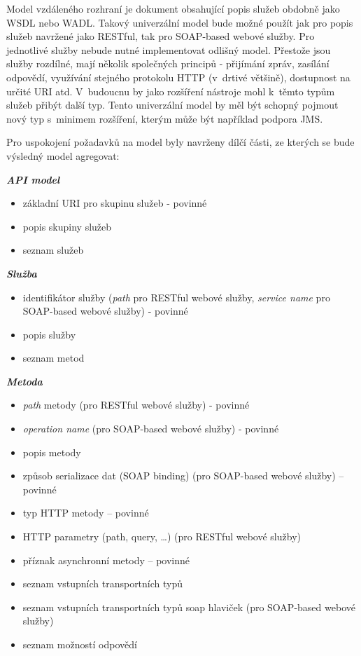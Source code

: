 \documentclass[11pt,twoside,a4paper]{book}
\begin{document}
Model vzdáleného rozhraní je dokument obsahující popis služeb obdobně jako WSDL
nebo WADL. Takový univerzální model bude možné použít jak pro popis služeb
navržené jako RESTful, tak pro SOAP-based webové služby. Pro jednotlivé služby
nebude nutné implementovat odlišný model. Přestože jsou služby rozdílné, mají
několik společných principů - přijímání zpráv, zasílání odpovědí, využívání
stejného protokolu HTTP (v~drtivé většině), dostupnost na určité URI atd.
V~budoucnu by jako rozšíření nástroje mohl k~těmto typům služeb přibýt další typ.
Tento univerzální model by měl být schopný pojmout nový typ s~minimem rozšíření,
kterým může být například podpora JMS.

Pro uspokojení požadavků na model byly navrženy dílčí části, ze kterých se bude
výsledný model agregovat:

\textbf{\textit{API model}}

\begin{itemize}
  \item základní URI pro skupinu služeb - povinné
  \item popis skupiny služeb
  \item seznam služeb
\end{itemize}

\textbf{\textit{Služba}}

\begin{itemize}
  \item identifikátor služby ({\em path} pro RESTful webové služby, {\em service
  name} pro SOAP-based webové služby) - povinné
  \item popis služby
  \item seznam metod
\end{itemize}

\textbf{\textit{Metoda}}

\begin{itemize}
  \item {\em path} metody (pro RESTful webové služby) - povinné
  \item {\em operation name} (pro SOAP-based webové služby) - povinné
  \item popis metody
  \item způsob serializace dat (SOAP binding) (pro SOAP-based webové služby) – povinné
  \item typ HTTP metody – povinné
  \item HTTP parametry (path, query, \ldots) (pro RESTful webové služby)
  \item příznak asynchronní metody – povinné
  \item seznam vstupních transportních typů
  \item seznam vstupních transportních typů soap hlaviček (pro SOAP-based webové služby)
  \item seznam možností odpovědí
\end{itemize}
\end{document}
